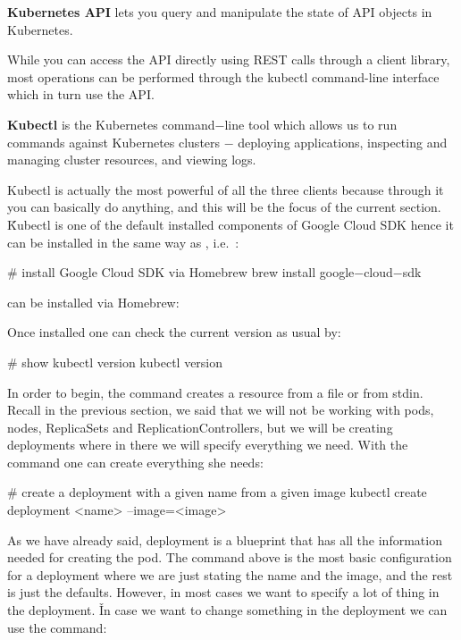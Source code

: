 \textbf{Kubernetes API} lets you query and manipulate the state of API objects in Kubernetes.
\ed

While you can access the API directly using REST calls through a client library, most operations can be performed
through the kubectl command-line interface which in turn use the API\@.

\bd[Kubectl]
\textbf{Kubectl} is the Kubernetes command$-$line tool which allows us to run commands against Kubernetes clusters $-$
deploying applications, inspecting and managing cluster resources, and viewing logs.
\ed

Kubectl is actually the most powerful of all the three clients because through it you can basically do anything, and
this will be the focus of the current section. \v

Kubectl is one of the default installed components of Google Cloud SDK hence it can be installed in the same way as
, i.e.\ :
\begin{bash}
# install Google Cloud SDK via Homebrew
brew install google$-$cloud$-$sdk
\end{bash} can be installed via Homebrew:

Once installed one can check the current version as usual by:
\begin{bash}
# show kubectl version
kubectl version
\end{bash}

In order to begin, the  command creates a resource from a file or from stdin. Recall in the
previous section, we said that we will not be working with pods, nodes, ReplicaSets and ReplicationControllers, but
we will be creating deployments where in there we will specify everything we need. With the  command one can create everything she needs:

\begin{bash}
# create a deployment with a given name from a given image
kubectl create deployment <name> --image=<image>
\end{bash}

As we have already said, deployment is a blueprint that has all the information needed for creating the pod. The
command above is the most basic configuration for a deployment where we are just stating the name and the image, and
the rest is just the defaults. However, in most cases we want to specify a lot of thing in the deployment. \v

In case we want to change something in the deployment we can use the  command:

